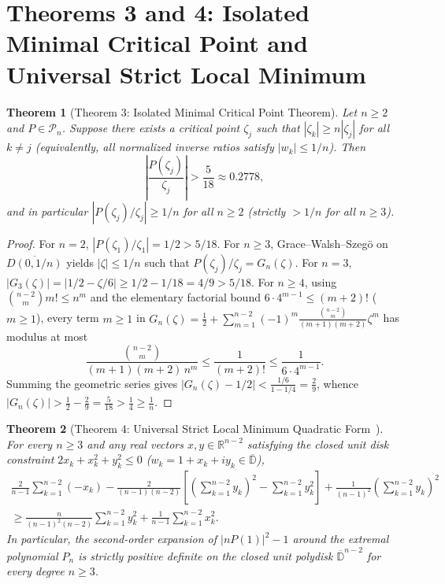 \documentclass[11pt,a4paper]{article}
\newtheorem{theorem}{Theorem}[section]
\theoremstyle{definition}
\theoremstyle{remark}
\newcommand{\RR}{\mathbb{R}}
\newcommand{\DD}{\mathbb{D}}
\begin{document}
\section{Theorems 3 and 4: Isolated Minimal Critical Point and Universal Strict Local Minimum}

\begin{theorem}[Theorem 3: Isolated Minimal Critical Point Theorem]
\label{thm:isolated}
Let $n \ge 2$ and $P \in \mathcal{P}_n$. Suppose there exists a critical point $\zeta_j$ such that $|\zeta_k| \ge n|\zeta_j|$ for all $k \neq j$ (equivalently, all normalized inverse ratios satisfy $|w_k| \le 1/n$). Then
\[
\left|\frac{P(\zeta_j)}{\zeta_j}\right| > \frac{5}{18} \approx 0.2778,
\]
and in particular $|P(\zeta_j)/\zeta_j| \ge 1/n$ for all $n \ge 2$ (strictly $> 1/n$ for all $n \ge 3$).
\end{theorem}

\begin{proof}
For $n = 2$, $|P(\zeta_1)/\zeta_1| = 1/2 > 5/18$. For $n \ge 3$, Grace--Walsh--Szeg\"o on $\overline{D(0, 1/n)}$ yields $|\zeta| \le 1/n$ such that $P(\zeta_j)/\zeta_j = G_n(\zeta)$.
For $n = 3$, $|G_3(\zeta)| = |1/2 - \zeta/6| \ge 1/2 - 1/18 = 4/9 > 5/18$.
For $n \ge 4$, using $\binom{n-2}{m} m! \le n^m$ and the elementary factorial bound $6 \cdot 4^{m-1} \le (m + 2)!$ ($m \ge 1$), every term $m \ge 1$ in $G_n(\zeta) = \frac{1}{2} + \sum_{m=1}^{n-2} (-1)^m \frac{\binom{n-2}{m}}{(m+1)(m+2)} \zeta^m$ has modulus at most
\[
\frac{\binom{n-2}{m}}{(m+1)(m+2)\, n^m} \le \frac{1}{(m+2)!} \le \frac{1}{6 \cdot 4^{m-1}}.
\]
Summing the geometric series gives $|G_n(\zeta) - 1/2| < \frac{1/6}{1 - 1/4} = \frac{2}{9}$, whence $|G_n(\zeta)| > \frac{1}{2} - \frac{2}{9} = \frac{5}{18} > \frac{1}{4} \ge \frac{1}{n}$.
\end{proof}

\begin{theorem}[Theorem 4: Universal Strict Local Minimum Quadratic Form~\cite{BesevicN8,BesevicN9}]
\label{thm:local-min}
For every $n \ge 3$ and any real vectors $x, y \in \RR^{n-2}$ satisfying the closed unit disk constraint $2 x_k + x_k^2 + y_k^2 \le 0$ ($w_k = 1 + x_k + i y_k \in \overline{\DD}$),
\begin{multline*}
\frac{2}{n-1}\sum_{k=1}^{n-2} (-x_k) - \frac{2}{(n-1)(n-2)}\!\left[\left(\sum_{k=1}^{n-2} y_k\right)^2 - \sum_{k=1}^{n-2} y_k^2\right] + \frac{1}{(n-1)^2}\left(\sum_{k=1}^{n-2} y_k\right)^2 \\
\ge \frac{n}{(n-1)^2(n-2)}\sum_{k=1}^{n-2} y_k^2 + \frac{1}{n-1}\sum_{k=1}^{n-2} x_k^2.
\end{multline*}
In particular, the second-order expansion of $|n P(1)|^2 - 1$ around the extremal polynomial $P_n$ is strictly positive definite on the closed unit polydisk $\overline{\DD}^{n-2}$ for every degree $n \ge 3$.
\end{theorem}
\end{document}
